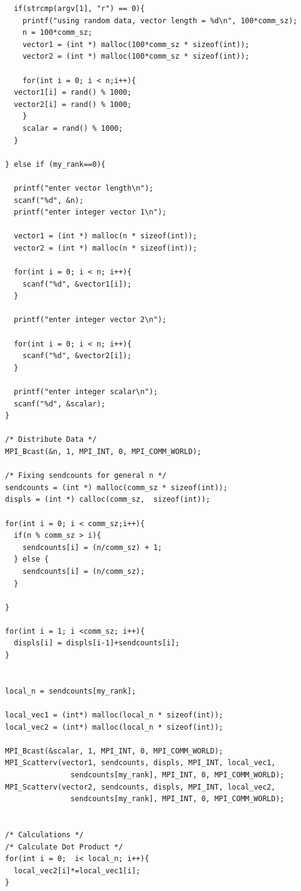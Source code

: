 \documentclass[a4paper,11pt,twoside]{article}
\begin{document}
{{{\begin{verbatim}
    if(strcmp(argv[1], "r") == 0){
      printf("using random data, vector length = %d\n", 100*comm_sz);
      n = 100*comm_sz;
      vector1 = (int *) malloc(100*comm_sz * sizeof(int));
      vector2 = (int *) malloc(100*comm_sz * sizeof(int));

      for(int i = 0; i < n;i++){
	vector1[i] = rand() % 1000;
	vector2[i] = rand() % 1000;
      }
      scalar = rand() % 1000;
    }
    
  } else if (my_rank==0){
     
    printf("enter vector length\n");
    scanf("%d", &n);
    printf("enter integer vector 1\n");

    vector1 = (int *) malloc(n * sizeof(int));
    vector2 = (int *) malloc(n * sizeof(int));

    for(int i = 0; i < n; i++){
      scanf("%d", &vector1[i]);
    }

    printf("enter integer vector 2\n");

    for(int i = 0; i < n; i++){
      scanf("%d", &vector2[i]);
    }

    printf("enter integer scalar\n");
    scanf("%d", &scalar);
  }

  /* Distribute Data */
  MPI_Bcast(&n, 1, MPI_INT, 0, MPI_COMM_WORLD);

  /* Fixing sendcounts for general n */
  sendcounts = (int *) malloc(comm_sz * sizeof(int));
  displs = (int *) calloc(comm_sz,  sizeof(int));

  for(int i = 0; i < comm_sz;i++){
    if(n % comm_sz > i){
      sendcounts[i] = (n/comm_sz) + 1;
    } else {
      sendcounts[i] = (n/comm_sz);
    }

  }

  for(int i = 1; i <comm_sz; i++){
    displs[i] = displs[i-1]+sendcounts[i];   
  }

 
  local_n = sendcounts[my_rank];

  local_vec1 = (int*) malloc(local_n * sizeof(int));
  local_vec2 = (int*) malloc(local_n * sizeof(int));
  
  MPI_Bcast(&scalar, 1, MPI_INT, 0, MPI_COMM_WORLD);
  MPI_Scatterv(vector1, sendcounts, displs, MPI_INT, local_vec1, 
                 sendcounts[my_rank], MPI_INT, 0, MPI_COMM_WORLD);
  MPI_Scatterv(vector2, sendcounts, displs, MPI_INT, local_vec2, 
                 sendcounts[my_rank], MPI_INT, 0, MPI_COMM_WORLD);

  
  /* Calculations */
  /* Calculate Dot Product */
  for(int i = 0;  i< local_n; i++){
    local_vec2[i]*=local_vec1[i];
  }


\end{verbatim}}}}
\end{document}
